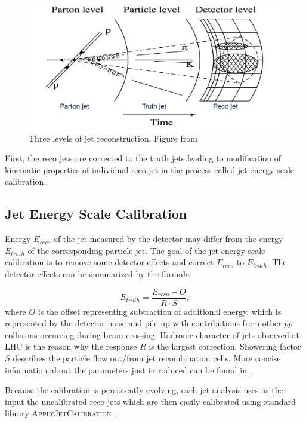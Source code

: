 \begin{figure}[t]
  \centering
  \includegraphics[width=\textwidth]{Chapter2/JetPhases.png}
  \caption{Three levels of jet reconstruction. Figure from \cite{ZdenekThesis} }
  \label{fig:JetPhases}
\end{figure}

First, the reco jets are corrected to the truth jets leading to modification
of kinematic properties of individual reco jet in the process called jet energy
scale calibration. 

\subsection{Jet Energy Scale Calibration}

Energy $E_{reco}$ of the jet measured by the detector may differ from the energy
$E_{truth}$ of the corresponding particle jet. The goal of the jet energy scale
calibration is to remove some detector effects and correct $E_{reco}$ to
$E_{truth}$. The detector effects can be summarized by the formula

\begin{equation}
  E_{truth} = \frac{E_{reco} - O}{R \cdot S},
\end{equation}
where $O$ is the offset representing subtraction of additional energy,
which is represented by the detector noise and pile-up with contributions from
other $pp$ collisions occurring during beam crossing. Hadronic character of
jets observed at LHC is the reason why the response $R$ is the largest
correction. Showering factor $S$ describes the particle flow out/from jet
recombination cells. More concise information about the parameters just
introduced can be found in \cite{ZdenekThesis}.

Because the calibration is persistently evolving, each jet analysis uses as the
input the uncalibrated reco jets which are then easily calibrated using
standard library \textsc{ApplyJetCalibration} \cite{ApplyJetCalibration}.

